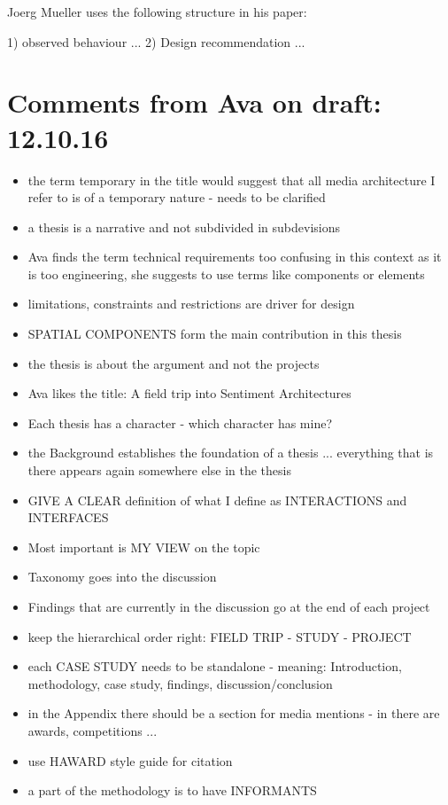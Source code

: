 
Joerg Mueller uses the following structure in his paper:

1) observed behaviour ... 2) Design recommendation ...

\section{Comments from Ava on draft: 12.10.16}

\begin{itemize}
\item the term temporary in the title would suggest that all media architecture I refer to is of a temporary nature - needs to be clarified
\item a thesis is a narrative and not subdivided in subdevisions
\item Ava finds the term technical requirements too confusing in this context as it is too engineering, she suggests to use terms like components or elements
\item limitations, constraints and restrictions are driver for design
\item SPATIAL COMPONENTS form the main contribution in this thesis
\item the thesis is about the argument and not the projects
\item Ava likes the title: A field trip into Sentiment Architectures
\item Each thesis has a character - which character has mine?
\item the Background establishes the foundation of a thesis ... everything that is there appears again somewhere else in the thesis 
\item GIVE A CLEAR definition of what I define as INTERACTIONS and INTERFACES
\item Most important is MY VIEW on the topic 
\item Taxonomy goes into the discussion 
\item Findings that are currently in the discussion go at the end of each project
\item keep the hierarchical order right: FIELD TRIP - STUDY - PROJECT
\item each CASE STUDY needs to be standalone - meaning: Introduction, methodology, case study, findings, discussion/conclusion
\item in the Appendix there should be a section for media mentions - in there are awards, competitions ...
\item use HAWARD style guide for citation
\item a part of the methodology is to have INFORMANTS

\end{itemize}
